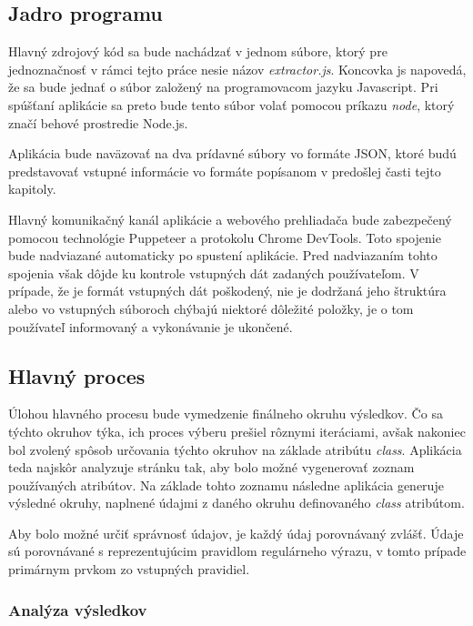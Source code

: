 \bigskip

\subsection{Jadro programu}

Hlavný zdrojový kód sa bude nachádzať v jednom súbore, ktorý pre jednoznačnosť v rámci tejto práce nesie názov \textit{extractor.js}. Koncovka js napovedá, že sa bude jednať o súbor založený na programovacom jazyku Javascript. Pri spúšťaní aplikácie sa preto bude tento súbor volať pomocou príkazu \textit{node}, ktorý značí behové prostredie Node.js.

Aplikácia bude naväzovať na dva prídavné súbory vo formáte JSON, ktoré budú predstavovať vstupné informácie vo formáte popísanom v predošlej časti tejto kapitoly. 

Hlavný komunikačný kanál aplikácie a webového prehliadača bude zabezpečený pomocou technológie Puppeteer a protokolu Chrome DevTools. Toto spojenie bude nadviazané automaticky po spustení aplikácie. Pred nadviazaním tohto spojenia však dôjde ku kontrole vstupných dát zadaných používateľom. V prípade, že je formát vstupných dát poškodený, nie je dodržaná jeho štruktúra alebo vo vstupných súboroch chýbajú niektoré dôležité položky, je o tom používateľ informovaný a vykonávanie je ukončené.

\subsection{Hlavný proces}

Úlohou hlavného procesu bude vymedzenie finálneho okruhu výsledkov. Čo sa týchto okruhov týka, ich proces výberu prešiel rôznymi iteráciami, avšak nakoniec bol zvolený spôsob určovania týchto okruhov na základe atribútu \textit{class}. Aplikácia teda najskôr analyzuje stránku tak, aby bolo možné vygenerovať zoznam používaných atribútov. Na základe tohto zoznamu následne aplikácia generuje výsledné okruhy, naplnené údajmi z daného okruhu definovaného \textit{class} atribútom. 

Aby bolo možné určiť správnosť údajov, je každý údaj porovnávaný zvlášť. Údaje sú porovnávané s reprezentujúcim pravidlom regulárneho výrazu, v tomto prípade primárnym prvkom zo vstupných pravidiel.


\subsubsection{Analýza výsledkov}

